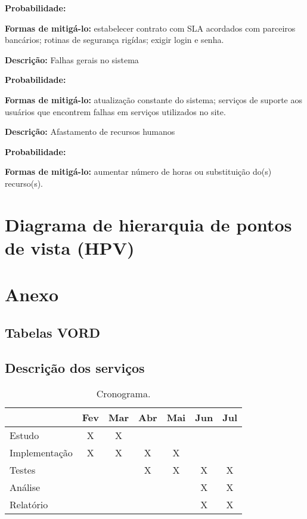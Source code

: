 \documentclass[12pt]{article}
\begin{document}
{\bf Probabilidade:}

{\bf Formas de mitigá-lo:} estabelecer contrato com SLA acordados com parceiros bancários; rotinas de segurança rigídas; exigir login e senha.


\bigskip
{\bf Descrição:} Falhas gerais no sistema

{\bf Probabilidade:}

{\bf Formas de mitigá-lo:} atualização constante do sistema; serviços de suporte aos usuários que encontrem falhas em serviços utilizados no site.


\bigskip
{\bf Descrição:} Afastamento de recursos humanos

{\bf Probabilidade:}

{\bf Formas de mitigá-lo:} aumentar número de horas ou substituição do(s) recurso(s).


\section{Diagrama de hierarquia de pontos de vista (HPV)}
\label{sec:diagrama}


\section{Anexo}
\subsection{Tabelas VORD}


\subsection{Descrição dos serviços}

\begin{table}[htb]
\centering
\begin{tabular}{l|c|c|c|c|c|c}
\hline 
                & Fev & Mar & Abr & Mai & Jun & Jul \\ 
\hline \hline
Estudo          & X   & X  &      &     &     &     \\ 
\hline 
Implementação   & X   & X  &  X   &  X  &     &     \\ 
\hline 
Testes          &     &    &  X   &  X  &  X  &  X  \\ 
\hline 
Análise         &     &    &      &     &  X  &  X  \\ 
\hline 
Relatório       &     &    &      &     &  X  &  X  \\ 
\hline 
\end{tabular} 
\caption{Cronograma.\label{tab:cronograma}} 
\end{table}


\end{document}

